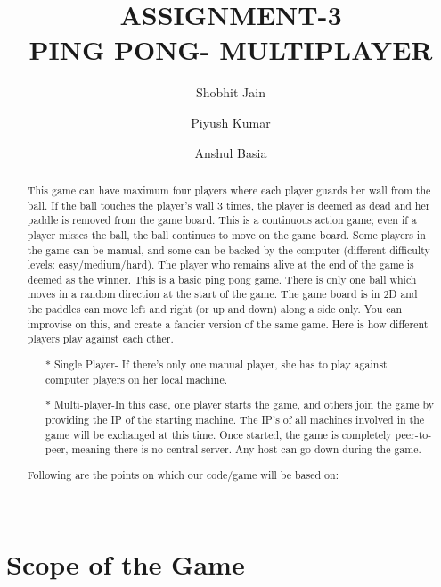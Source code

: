 \documentclass[10pt]{asme2ej}
\title{ASSIGNMENT-3 \\
PING PONG- MULTIPLAYER}
\author{Shobhit Jain
    \affiliation{
	Electrical Engineering\\
	2014EE10134
	
    }	
}
\author{Piyush Kumar
    \affiliation{
	Electrical (Power and automation)\\
	2014EE30527
    }	
}
\author{Anshul Basia
    \affiliation{
	Mathamatics and Computing\\
	2014MT60502
	
    }	
}
\begin{document}
\maketitle    

\begin{abstract}
{


\large This game can have maximum four players where each player guards her wall from the ball. If the ball touches the player’s wall 3 times, the player is deemed as dead and her paddle is removed from the game board. This is a continuous action game; even if a player misses the ball, the ball continues to move on the game board. Some players in the game can be manual, and some can be backed by the computer (different difficulty levels: easy/medium/hard). The player who remains alive at the end of the game is deemed as the winner.
This is a basic ping pong game. There is only one ball which moves in a random direction at the start of the game. The game board is in 2D and the paddles can move left and right (or up and down) along a side only. You can improvise on this, and create a fancier version of the same game. Here is how different players play against each other.\newline \newline
\begin{itemize}
  \item[$\ast$]  Single Player- If there’s only one manual player, she has to play against computer players on her local machine.
  \newline
 \item[$\ast$] Multi-player-In this case, one player starts the game, and others join the game by providing the IP of the starting machine. The IP's of all machines involved in the game will be exchanged at this time. Once started, the game is completely peer-to-peer, meaning there is no central server. Any host can go down during the game.
 \newline
 


\end{itemize}
Following are the points on which our code/game will be based on:
\\  
\\
}
\end{abstract}

\Huge

\section{Scope of the Game}
\end{document}
